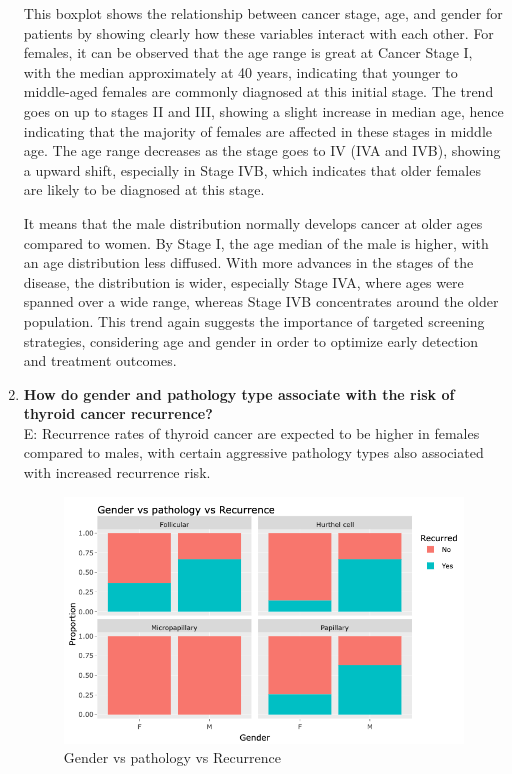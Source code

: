\documentclass[12pt]{article}
\begin{document}
\begin{enumerate}
This boxplot shows the relationship between cancer stage, age, and gender for patients by showing clearly how these variables interact with each other. For females, it can be observed that the age range is great at Cancer Stage I, with the median approximately at 40 years, indicating that younger to middle-aged females are commonly diagnosed at this initial stage. The trend goes on up to stages II and III, showing a slight increase in median age, hence indicating that the majority of females are affected in these stages in middle age. The age range decreases as the stage goes to IV (IVA and IVB), showing a upward shift, especially in Stage IVB, which indicates that older females are likely to be diagnosed at this stage.

It means that the male distribution normally develops cancer at older ages compared to women. By Stage I, the age median of the male is higher, with an age distribution less diffused. With more advances in the stages of the disease, the distribution is wider, especially Stage IVA, where ages were spanned over a wide range, whereas Stage IVB concentrates around the older population. This trend again suggests the importance of targeted screening strategies, considering age and gender in order to optimize early detection and treatment outcomes.

\newpage

\item \textbf{How do gender and pathology type associate with the risk of thyroid cancer recurrence?} \\
E: Recurrence rates of thyroid cancer are expected to be higher in females compared to males, with certain aggressive pathology types also associated with increased recurrence risk.

 \begin{figure}[h]
        \vspace{5pt}
        \centering
        \includegraphics[width=1.1\textwidth]{gender vs path vs recc.png}  
        \caption{Gender vs pathology vs Recurrence}
            \label{fig:example}
       \vspace{0.5cm}
    \end{figure}


\end{enumerate}
\end{document}
